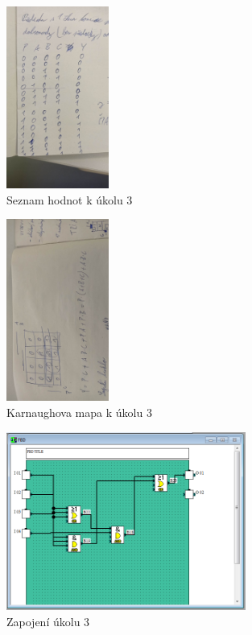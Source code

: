\documentclass[12pt,a4paper]{article}
\begin{document}
\begin{figure}[H]
	\centering
	\includegraphics[width=0.3\textwidth]{foto1.jpg}
	\caption{Seznam hodnot k úkolu 3}
	\label{fig:foto1}
\end{figure}
\begin{figure}[H]
	\centering
	\includegraphics[width=0.3\textwidth, angle=270]{foto2.jpg}
	\caption{Karnaughova mapa k úkolu 3}
	\label{fig:foto2}
\end{figure}
\begin{figure}[H]
	\centering
	\includegraphics[width=0.7\textwidth]{PLC_3.png}
	\caption{Zapojení úkolu 3}
	\label{fig:mesh3}
\end{figure}
\end{document}
